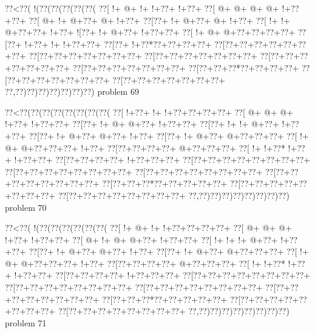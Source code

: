 \vbox{\vbox{\goo
\0??<\0??(\- !(\0??(\0??(\0??(\0??(\0??(
\0??[\- !+\- @+\- !+\- !+\0??+\- !+\0??+
\0??[\- @+\- @+\- @+\- @+\- !+\0??+\0??+
\0??[\- @+\- !+\- @+\0??+\- @+\- !+\0??+
\0??[\0??+\- !+\- @+\0??+\- @+\- !+\0??+
\0??[\- !+\- !+\- @+\0??+\0??+\- !+\0??+
\- ![\0??+\- !+\- @+\0??+\- !+\0??+\0??+
\0??[\- !+\- @+\- @+\0??+\0??+\0??+\0??+
\0??[\0??+\- !+\0??+\- !+\- !+\0??+\0??+
\0??[\0??+\- !+\0??*\0??+\0??+\0??+\0??+
\0??[\0??+\0??+\0??+\0??+\0??+\0??+\0??+
\0??[\0??+\0??+\0??+\0??+\0??+\0??+\0??+
\0??[\0??+\0??+\0??+\0??+\0??+\0??+\0??+
\0??[\0??+\0??+\0??+\0??+\0??+\0??+\0??+
\0??[\0??+\0??+\0??+\0??+\0??+\0??+\0??+
\0??[\0??+\0??+\0??*\0??+\0??+\0??+\0??+
\0??[\0??+\0??+\0??+\0??+\0??+\0??+\0??+
\0??[\0??+\0??+\0??+\0??+\0??+\0??+\0??+
\0??,\0??)\0??)\0??)\0??)\0??)\0??)\0??)
}
\hfil problem 69\hfil\break
}

\vbox{\vbox{\goo
\0??<\0??(\0??(\0??(\0??(\0??(\0??(\0??(\0??(
\0??[\- !+\0??+\- !+\- !+\0??+\0??+\0??+\0??+
\0??[\- @+\- @+\- @+\- !+\0??+\- !+\0??+\0??+
\0??[\0??+\- !+\- @+\- @+\0??+\- !+\0??+\0??+
\0??[\0??+\- !+\- !+\- @+\0??+\- !+\0??+\0??+
\0??[\0??+\- !+\- @+\0??+\- @+\0??+\- !+\0??+
\0??[\0??+\- !+\- @+\0??+\- @+\0??+\0??+\0??+
\0??[\- !+\- @+\- @+\0??+\0??+\0??+\- !+\0??+
\0??[\0??+\0??+\0??+\0??+\- @+\0??+\0??+\0??+
\0??[\- !+\- !+\0??*\- !+\0??+\- !+\0??+\0??+
\0??[\0??+\0??+\0??+\0??+\- !+\0??+\0??+\0??+
\0??[\0??+\0??+\0??+\0??+\0??+\0??+\0??+\0??+
\0??[\0??+\0??+\0??+\0??+\0??+\0??+\0??+\0??+
\0??[\0??+\0??+\0??+\0??+\0??+\0??+\0??+\0??+
\0??[\0??+\0??+\0??+\0??+\0??+\0??+\0??+\0??+
\0??[\0??+\0??+\0??*\0??+\0??+\0??+\0??+\0??+
\0??[\0??+\0??+\0??+\0??+\0??+\0??+\0??+\0??+
\0??[\0??+\0??+\0??+\0??+\0??+\0??+\0??+\0??+
\0??,\0??)\0??)\0??)\0??)\0??)\0??)\0??)\0??)
}
\hfil problem 70\hfil\break
}

\vbox{\vbox{\goo
\0??<\0??(\- !(\0??(\0??(\0??(\0??(\0??(\0??(
\0??[\- !+\- @+\- !+\- !+\0??+\0??+\0??+\0??+
\0??[\- @+\- @+\- @+\- !+\0??+\- !+\0??+\0??+
\0??[\- @+\- !+\- @+\- @+\0??+\- !+\0??+\0??+
\0??[\- !+\- !+\- !+\- @+\0??+\- !+\0??+\0??+
\0??[\0??+\- !+\- @+\0??+\- @+\0??+\- !+\0??+
\0??[\0??+\- !+\- @+\0??+\- @+\0??+\0??+\0??+
\0??[\- !+\- @+\- @+\0??+\0??+\0??+\- !+\0??+
\0??[\0??+\0??+\0??+\0??+\- @+\0??+\0??+\0??+
\0??[\- !+\- !+\0??*\- !+\0??+\- !+\0??+\0??+
\0??[\0??+\0??+\0??+\0??+\- !+\0??+\0??+\0??+
\0??[\0??+\0??+\0??+\0??+\0??+\0??+\0??+\0??+
\0??[\0??+\0??+\0??+\0??+\0??+\0??+\0??+\0??+
\0??[\0??+\0??+\0??+\0??+\0??+\0??+\0??+\0??+
\0??[\0??+\0??+\0??+\0??+\0??+\0??+\0??+\0??+
\0??[\0??+\0??+\0??*\0??+\0??+\0??+\0??+\0??+
\0??[\0??+\0??+\0??+\0??+\0??+\0??+\0??+\0??+
\0??[\0??+\0??+\0??+\0??+\0??+\0??+\0??+\0??+
\0??,\0??)\0??)\0??)\0??)\0??)\0??)\0??)\0??)
}
\hfil problem 71\hfil\break
}

